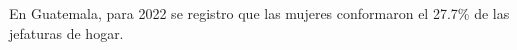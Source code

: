 En Guatemala, para 2022 se registro que las mujeres conformaron el 27.7\% de las jefaturas de hogar.